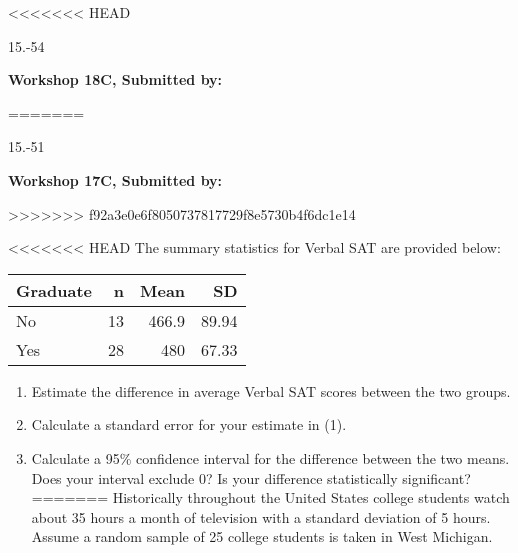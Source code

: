 <<<<<<< HEAD
\begin{exsol@exercise}{15.-54}
    \begin{center}
\begin{flushleft}\textbf{\large \hfill Workshop 18C, Submitted by: }\end{flushleft}
=======
\begin{exsol@exercise}{15.-51}
    \begin{center}
\begin{flushleft}\textbf{\large \hfill Workshop 17C, Submitted by: }\end{flushleft}
>>>>>>> f92a3e0e6f8050737817729f8e5730b4f6dc1e14

\end{center}

<<<<<<< HEAD
The summary statistics for Verbal SAT are provided below:

\begin{tabular}{@{} l rrr @{}} \hline
Graduate &	n &	Mean &	SD \\ \hline
No &	13 &	466.9 &	89.94 \\
Yes &	28 &	480 &	67.33 \\ \hline
\end{tabular}

\begin{enumerate}
  \item Estimate the difference in average Verbal SAT scores between the two groups.
  \item	Calculate a standard error for your estimate in (1).
  \item	Calculate a 95\% confidence interval for the difference between the two means. Does your interval exclude 0?  Is your difference statistically significant?
=======
Historically throughout the United States college students watch about 35 hours a month of television with a standard deviation of 5 hours. Assume a random sample of 25 college students is taken in West Michigan.


\end{enumerate}
\end{exsol@exercise}
\end{center}
\end{exsol@exercise}
